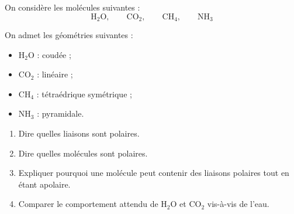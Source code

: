 \documentclass[11pt,a4paper]{article}
\begin{document}
\begin{enoncebox}
On considère les molécules suivantes :
\[
\mathrm{H_2O},\qquad \mathrm{CO_2},\qquad \mathrm{CH_4},\qquad \mathrm{NH_3}
\]

On admet les géométries suivantes :
\begin{itemize}
    \item \(\mathrm{H_2O}\) : coudée ;
    \item \(\mathrm{CO_2}\) : linéaire ;
    \item \(\mathrm{CH_4}\) : tétraédrique symétrique ;
    \item \(\mathrm{NH_3}\) : pyramidale.
\end{itemize}

\begin{enumerate}[label=\arabic*)]
    \item Dire quelles liaisons sont polaires.
    \item Dire quelles molécules sont polaires.
    \item Expliquer pourquoi une molécule peut contenir des liaisons polaires tout en étant apolaire.
    \item Comparer le comportement attendu de \(\mathrm{H_2O}\) et \(\mathrm{CO_2}\) vis-à-vis de l'eau.
\end{enumerate}
\end{enoncebox}
\end{document}
